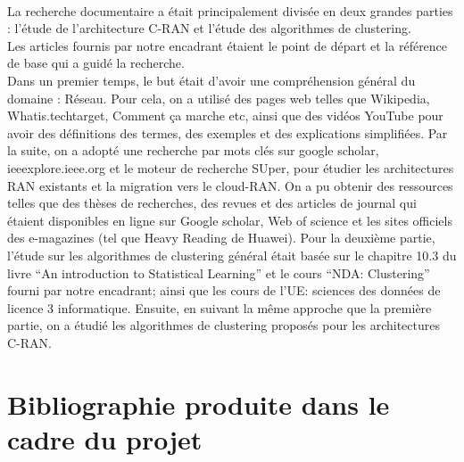 \documentclass{article}
\begin{document}
\paragraph{}
La recherche documentaire a était principalement divisée en deux grandes parties : 
l'étude de l'architecture C-RAN et l'étude des algorithmes de clustering.\\
Les articles fournis par notre encadrant étaient le point de départ et la référence 
de base qui a guidé la recherche. \\
Dans un premier temps, le but était d’avoir une compréhension général du domaine : Réseau. 
Pour cela, on a utilisé des pages web telles que Wikipedia, Whatis.techtarget, Comment ça marche 
etc, ainsi que des vidéos YouTube pour avoir des définitions des termes, des exemples et des 
explications simplifiées. Par la suite, on a adopté une recherche par mots clés sur google 
scholar, ieeexplore.ieee.org et le moteur de recherche SUper, pour étudier les architectures 
RAN existants et la migration vers le cloud-RAN. On a pu obtenir des ressources telles 
que des thèses de recherches, des revues et des articles de journal qui étaient disponibles en ligne sur Google scholar, 
Web of science et les sites officiels des e-magazines (tel que Heavy Reading de Huawei).
Pour la deuxième partie, l’étude sur les algorithmes de clustering général était basée sur le chapitre 10.3 du livre 
“An introduction to Statistical Learning” et le cours “NDA: Clustering” fourni par notre encadrant; ainsi que les cours de 
l'UE: sciences des données de licence 3 informatique. Ensuite, en suivant la même approche que la première partie, on a 
étudié les algorithmes de clustering proposés pour les architectures C-RAN.
\section{Bibliographie produite dans le cadre du projet}
\end{document}
